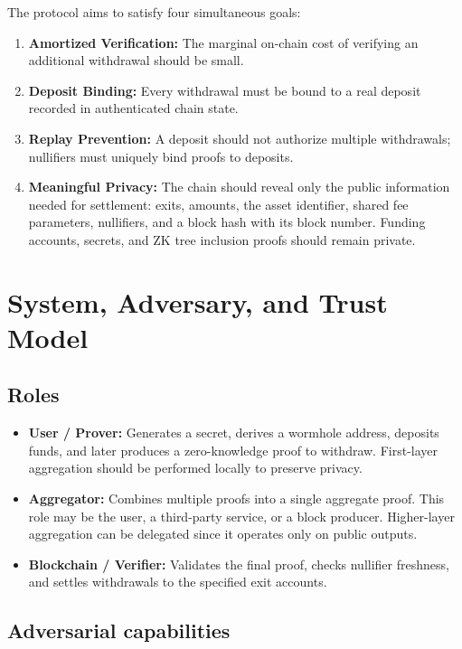 \documentclass{iacrcc}
\begin{document}
The protocol aims to satisfy four simultaneous goals:
\begin{enumerate}[leftmargin=1.5em]
    \item \textbf{Amortized Verification:} The marginal on-chain cost of verifying an additional withdrawal should be small.
    \item \textbf{Deposit Binding:} Every withdrawal must be bound to a real deposit recorded in authenticated chain state.
    \item \textbf{Replay Prevention:} A deposit should not authorize multiple withdrawals; nullifiers must uniquely bind proofs to deposits.
    \item \textbf{Meaningful Privacy:} The chain should reveal only the public information needed for settlement: exits, amounts, the asset identifier, shared fee parameters, nullifiers, and a block hash with its block number. Funding accounts, secrets, and ZK tree inclusion proofs should remain private.
\end{enumerate}

\section{System, Adversary, and Trust Model}
\label{sec:model}

\subsection{Roles}

\begin{itemize}[leftmargin=1.5em]
    \item \textbf{User / Prover:} Generates a secret, derives a wormhole address, deposits funds, and later produces a zero-knowledge proof to withdraw. First-layer aggregation should be performed locally to preserve privacy.
    \item \textbf{Aggregator:} Combines multiple proofs into a single aggregate proof. This role may be the user, a third-party service, or a block producer. Higher-layer aggregation can be delegated since it operates only on public outputs.
    \item \textbf{Blockchain / Verifier:} Validates the final proof, checks nullifier freshness, and settles withdrawals to the specified exit accounts.
\end{itemize}

\subsection{Adversarial capabilities}
\end{document}
